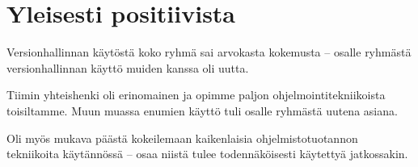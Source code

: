 \documentclass{article}
\begin{document}
\section{Yleisesti positiivista}

Versionhallinnan käytöstä koko ryhmä sai arvokasta kokemusta -- osalle ryhmästä versionhallinnan käyttö muiden kanssa oli uutta.

Tiimin yhteishenki oli erinomainen ja opimme paljon ohjelmointitekniikoista toisiltamme. Muun muassa enumien käyttö tuli osalle ryhmästä uutena asiana.

Oli myös mukava päästä kokeilemaan kaikenlaisia ohjelmistotuotannon tekniikoita käytännössä -- osaa niistä tulee todennäköisesti käytettyä jatkossakin.
\end{document}
